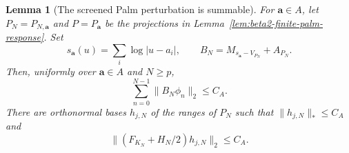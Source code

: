 \documentclass[11pt,a4paper]{article}
\numberwithin{equation}{section}
\newtheorem{lemma}[theorem]{Lemma}
\theoremstyle{definition}
\theoremstyle{remark}
\begin{document}
\begin{lemma}[The screened Palm perturbation is summable]
\label{lem:beta2-screened-palm-trace}
For $\mathbf a\in A$, let $P_N=P_{N,\mathbf a}$ and
$P=P_{\mathbf a}$ be the projections in
Lemma~\ref{lem:beta2-finite-palm-response}.  Set
\[
 s_{\mathbf a}(u)=\sum_i\log|u-a_i|,
 \qquad B_N=M_{s_{\mathbf a}-V_{P_N}}+A_{P_N}.
\]
Then, uniformly over $\mathbf a\in A$ and $N\ge p$,
\begin{equation}
 \sum_{n=0}^{N-1}\|B_N\phi_n\|_2\le C_A.
 \label{eq:beta2-screened-column-sum}
\end{equation}
There are orthonormal bases $h_{j,N}$ of the ranges of $P_N$ such
that $\|h_{j,N}\|_*\le C_A$ and
\begin{equation}
 \|(F_{K_N}+H_N/2)h_{j,N}\|_2\le C_A.
 \label{eq:beta2-screened-F-column}
\end{equation}
\end{lemma}
\end{document}
